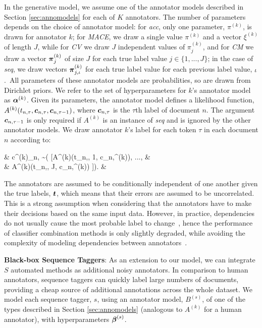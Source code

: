 In the generative model, we assume one of the annotator 
models described in Section \ref{sec:annomodels} for each of $K$ annotators.
The number of parameters depends on the choice of annotator model:
for \emph{acc}, only one parameter, $\pi^{(k)}$, is drawn for annotator $k$;
for \emph{MACE}, we draw a single value $\pi^{(k)}$ and a vector $\xi^{(k)}$ of length $J$, 
while for \emph{CV} we draw $J$ independent values of $\pi_j^{(k)}$, 
and for \emph{CM}  
we draw a vector $\boldsymbol\pi^{(k)}_j$ of size $J$ for each true label value $j\in \{1,...,J\}$; in the case of \emph{seq}, 
we draw vectors $\boldsymbol\pi^{(k)}_{j,\iota}$ for each true label value 
for each previous label value, $\iota$.\
All parameters of these annotator models are probabilities, 
so are drawn from Dirichlet priors. We refer to the set of hyperparameters 
for $k$'s annotator model as $\boldsymbol\alpha^{(k)}$.
Given its parameters, the annotator model defines a likelihood function,
$A^{(k)}(t_{n,\tau}, \boldsymbol c_{n,\tau}, \boldsymbol c_{n,\tau-1})$, where $\boldsymbol c_{n,\tau}$ is the $\tau$th label of document $n$.
The argument $\boldsymbol c_{n,\tau-1}$ is only required if $A^{(k)}$ is an instance
of \emph{seq} and is ignored by the other annotator models.
We draw annotator $k$'s label for each token $\tau$ in each document $n$ 
according to:
\begin{flalign}
& c^{(k)}_{n,\tau} \sim {}( [A^{(k)}(t_{n,\tau}, 1, \bs c_{n,}^{(k)}), ..., & \nonumber \\
& \hspace{3cm} A^{(k)}(t_{n,\tau}, J, \bs c_{n,\tau-1}^{(k)}) ]). &
\end{flalign}
The annotators are assumed to be conditionally independent of one another given the true labels,
$\boldsymbol t$, which means that their errors are assumed to be uncorrelated. This is a strong assumption
when considering that the annotators have to make their decisions based
on the same input data. However, in practice, dependencies do not usually cause the 
most probable label to change~\citep{zhang2004optimality}, hence the performance of classifier combination methods 
is only slightly degraded, while avoiding the complexity of modeling dependencies between annotators~\citep{kim2012bayesian}.

\textbf{Black-box Sequence Taggers}:
As an extension to our model, we can integrate $S$ automated methods as
additional noisy annotators. 
 In comparison to human annotators,
sequence taggers can quickly label large numbers of documents, 
providing a cheap source of additional annotations across the whole dataset.
We model each sequence tagger, $s$, 
using an annotator model, $B^{(s)}$,
of one of the types described in Section \ref{sec:annomodels} (analogous to $A^{(k)}$ for a human annotator),
with hyperparameters $\boldsymbol \beta^{(s)}$.

